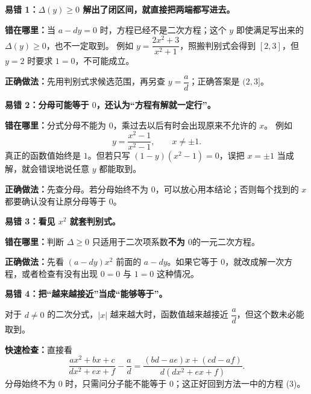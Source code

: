 \clearpage
\begin{trapbox}
  \textbf{\textcolor{CTrap}{易错 1：$\Delta(y)\ge0$ 解出了闭区间，就直接把两端都写进去。}}
\begin{center}\end{center}


  \medskip
  \textbf{错在哪里：}当 $a-dy=0$ 时，方程已经不是二次方程；这个 $y$ 即使满足写出来的 $\Delta(y)\ge0$，也不一定取到。
  例如 $y=\dfrac{2x^2+3}{x^2+1}$，照搬判别式会得到 $[2,3]$，但 $y=2$ 时要求 $1=0$，不可能成立。
  \par\textbf{正确做法：}先用判别式求候选范围，再另查 $y=\dfrac ad$；正确答案是 $(2,3]$。

  \bigskip
\end{trapbox}
\clearpage
\begin{trapbox}
\textbf{\textcolor{CTrap}{易错 2：分母可能等于 $0$，还认为“方程有解就一定行”。}}
\begin{center}\end{center}


  \medskip
  \textbf{错在哪里：}分式分母不能为 $0$，乘过去以后有时会出现原来不允许的 $x$。
  例如
  \[
    y=\frac{x^2-1}{x^2-1},\qquad x\ne\pm1.
  \]
  真正的函数值始终是 $1$。但若只写 $(1-y)(x^2-1)=0$，误把 $x=\pm1$ 当成解，就会错误地说任意 $y$ 都能取到。
  \par\textbf{正确做法：}先查分母。若分母始终不为 $0$，可以放心用本结论；否则每个找到的 $x$ 都要确认没有让原分母等于 $0$。

  \bigskip
\end{trapbox}
\clearpage
\begin{trapbox}
\textbf{\textcolor{CTrap}{易错 3：看见 $x^2$ 就套判别式。}}
\begin{center}\end{center}


  \medskip
  \textbf{错在哪里：}判断 $\Delta\ge0$ 只适用于二次项系数\textbf{不为 $0$}的一元二次方程。
  \par\textbf{正确做法：}先看 $(a-dy)x^2$ 前面的 $a-dy$。如果它等于 $0$，就改成解一次方程，或者检查有没有出现 $0=0$ 与 $1=0$ 这种情况。

  \bigskip
\end{trapbox}
\clearpage
\begin{trapbox}
\textbf{\textcolor{CTrap}{易错 4：把“越来越接近”当成“能够等于”。}}
\begin{center}\end{center}


  \medskip
  对于 $d\ne0$ 的二次分式，$|x|$ 越来越大时，函数值越来越接近 $\dfrac ad$，但这个数未必能取到。
  \par\textbf{快速检查：}直接看
  \[
    \frac{ax^2+bx+c}{dx^2+ex+f}-\frac ad
    =\frac{(bd-ae)x+(cd-af)}{d(dx^2+ex+f)}.
  \]
  分母始终不为 $0$ 时，只需问分子能不能等于 $0$；这正好回到方法一中的方程 (3)。

  \bigskip
\end{trapbox}
